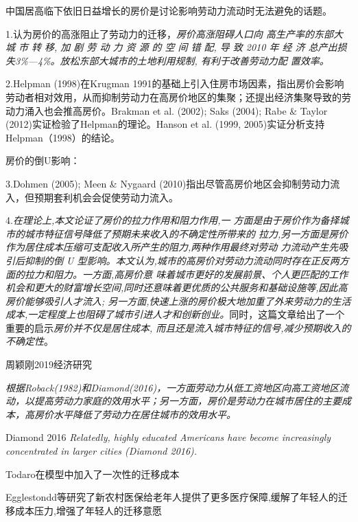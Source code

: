 \documentclass[a4paper,12pt]{article}
\begin{document}
中国居高临下依旧日益增长的房价是讨论影响劳动力流动时无法避免的话题。

1.\cite{WangLiLiTuDiGongGeiFangJieYuLaoDongLiKongJianPeiZhiXiaoLu2023}认为房价的高涨阻止了劳动力的迁移，\textit{房价高涨阻碍人口向 高生产率的东部大 城 市 转 移, 加 剧 劳 动 力 资 源 的 空 间 错 配, 导 致 2010 年 经 济 总产出损失3\%—4\%。放松东部大城市的土地利用规制, 有利于改善劳动力配 置效率。}

2.Helpman (1998)在Krugman 1991的基础上引入住房市场因素，指出房价会影响劳动者相对效用，从而抑制劳动力在高房价地区的集聚；还提出经济集聚导致的劳动力涌入也会推高房价。Brakman et al. (2002); Saks (2004); Rabe \& Taylor (2012)实证检验了Helpman的理论。Hanson et al. (1999, 2005)实证分析支持Helpman（1998）的结论。

房价的倒U影响：

3.Dohmen (2005); Meen \& Nygaard (2010)指出尽管高房价地区会抑制劳动力流入，但预期套利机会会促使劳动力流入。

4.\cite{ZhangLiFangJieRuHeYingXiangLaoDongLiLiuDong2017}\textit{在理论上,本文论证了房价的拉力作用和阻力作用,一 方面是由于房价作为备择城市的城市特征信号降低了预期未来收入的不确定性所带来的 拉力,另一方面是房价作为居住成本压缩可支配收入所产生的阻力,两种作用最终对劳动 力流动产生先吸引后抑制的倒 U 型影响。本文认为,城市的高房价对劳动力流动同时存在正反两方面的拉力和阻力。一方面,高房价意  味着城市更好的发展前景、个人更匹配的工作机会和更大的财富增长空间,同时还意味着更优质的公共服务和基础设施等,因此高房价能够吸引人才流入; 另一方面,快速上涨的房价极大地加重了外来劳动力的生活成本,一定程度上也阻碍了城市引进人才和创新创业。}同时，这篇文章给出了一个重要的启示\textit{房价并不仅是居住成本, 而且还是流入城市特征的信号,减少预期收入的不确定性}。

周颖刚2019经济研究\cite{ZhouYingGangGaoFangJieJiChuLiaoShuiJiYuZhongGuoLiuDongRenKouDeWeiGuanShiJiao2019}

\textit{根据Roback(1982)和Diamond(2016)，一方面劳动力从低工资地区向高工资地区流动，以提高劳动力家庭的效用水平；另一方面，房价是劳动力在城市居住的主要成本，高房价水平降低了劳动力在居住城市的效用水平。}

Diamond 2016\cite{diamondDeterminantsWelfareImplications2016} \textit{Relatedly, highly educated Americans have become increasingly concentrated in larger cities (Diamond 2016).}

Todaro在模型中加入了一次性的迁移成本

Egglestondd等研究了新农村医保给老年人提供了更多医疗保障,缓解了年轻人的迁移成本压力,增强了年轻人的迁移意愿
\end{document}
